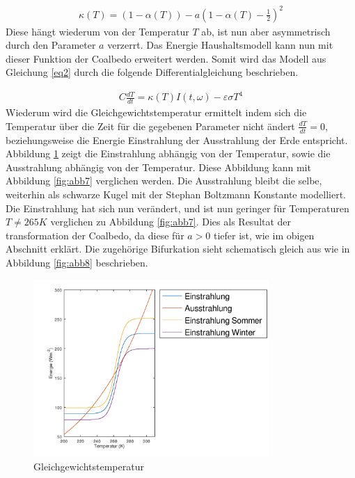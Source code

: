 \begin{refsection}
\begin{eqnarray*}
\kappa(T)=(1-\alpha(T)) - a \left( 1-\alpha(T) - \frac{1}{2} \right)^2
\end{eqnarray*}
Diese hängt wiederum von der Temperatur $T$ ab, ist nun aber asymmetrisch durch den Parameter $a$ verzerrt. Das Energie Haushaltsmodell kann nun mit dieser Funktion der Coalbedo erweitert werden. Somit wird das Modell aus Gleichung \ref{eq2} durch die folgende Differentialgleichung beschrieben. 

\begin{eqnarray} \label{eq5}
C \frac{d T}{d t} =  \kappa(T) I(t, \omega) - \varepsilon \sigma T^4
\end{eqnarray}
Wiederum wird die Gleichgewichtstemperatur ermittelt indem sich die Temperatur über die Zeit für die gegebenen Parameter nicht ändert $\frac{d T}{d t}=0$, beziehungsweise die Energie Einstrahlung der Ausstrahlung der Erde entspricht. Abbildung \ref{fig:abb11} zeigt die Einstrahlung abhängig von der Temperatur, sowie die Ausstrahlung abhängig von der Temperatur. Diese Abbildung kann mit Abbildung \ref{fig:abb7} verglichen werden. Die Ausstrahlung bleibt die selbe, weiterhin als schwarze Kugel mit der Stephan Boltzmann Konstante modelliert. Die Einstrahlung hat sich nun verändert, und ist nun geringer für Temperaturen $T \neq 265 K$ verglichen zu Abbildung \ref{fig:abb7}. Dies als Resultat der transformation der Coalbedo, da diese für $a>0$ tiefer ist, wie im obigen Abschnitt erklärt. Die zugehörige Bifurkation sieht schematisch gleich aus wie in Abbildung \ref{fig:abb8} beschrieben. 
%
\begin{figure}
	\centering
	\includegraphics[width= 0.8\textwidth]{Strahlung_3.png}
	\caption[Gleichgewichtstemperatur]{Gleichgewichtstemperatur}
	\label{fig:abb11}
\end{figure}
%


\end{refsection}
